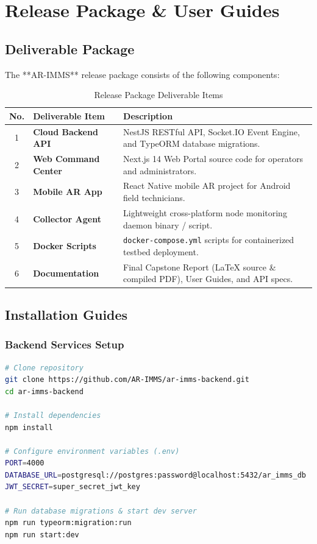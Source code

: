 \chapter{Release Package \& User Guides}

\section{Deliverable Package}
The **AR-IMMS** release package consists of the following components:

\begin{table}[H]
    \centering
    \caption{Release Package Deliverable Items}
    \begin{tabular}{|c|l|p{9cm}|}
        \hline
        \textbf{No.} & \textbf{Deliverable Item} & \textbf{Description} \\ \hline
        1 & \textbf{Cloud Backend API} & NestJS RESTful API, Socket.IO Event Engine, and TypeORM database migrations. \\ \hline
        2 & \textbf{Web Command Center} & Next.js 14 Web Portal source code for operators and administrators. \\ \hline
        3 & \textbf{Mobile AR App} & React Native mobile AR project for Android field technicians. \\ \hline
        4 & \textbf{Collector Agent} & Lightweight cross-platform node monitoring daemon binary / script. \\ \hline
        5 & \textbf{Docker Scripts} & \texttt{docker-compose.yml} scripts for containerized testbed deployment. \\ \hline
        6 & \textbf{Documentation} & Final Capstone Report (LaTeX source \& compiled PDF), User Guides, and API specs. \\ \hline
    \end{tabular}
\end{table}

\section{Installation Guides}

\subsection{Backend Services Setup}
\begin{lstlisting}[language=bash, caption=NestJS Backend Installation Commands]
# Clone repository
git clone https://github.com/AR-IMMS/ar-imms-backend.git
cd ar-imms-backend

# Install dependencies
npm install

# Configure environment variables (.env)
PORT=4000
DATABASE_URL=postgresql://postgres:password@localhost:5432/ar_imms_db
JWT_SECRET=super_secret_jwt_key

# Run database migrations & start dev server
npm run typeorm:migration:run
npm run start:dev
\end{lstlisting}

